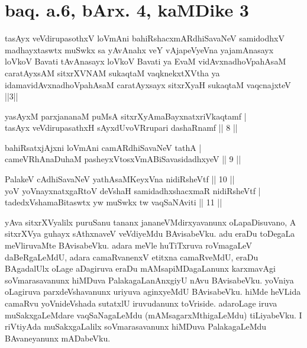 
\section*{baq. a.6, bArx. 4, kaMDike 3}

\begin{shl}
tasAyx veVdirupasothxV loVmAni bahiRshacxmARdhiSavaNeV samidodhxV madhayxtaswtx muSwkx sa yAvAnahx veY vAjapeVyeVna yajamAnasayx loVkoV Bavati tAvAnasayx loVkoV Bavati ya EvaM vidAvxnadhoVpahAsaM caratAyxsAM sitxrXVNAM sukaqtaM vaqknekxtXV\s tha ya idamavidAvxnadhoVpahAsaM caratAyxsayx sitxrXyaH sukaqtaM vaqcnajxteV ||3||
\end{shl}

\begin{shl}
yasAyxM  parxjananaM puMsA sitxrXyAmaBayxnatxriVkaqtamf | \\
tasAyx veVdirupasathxH sAyxdUvoVRrupari dashaRnamf \hfill|| 8 || 
\end{shl}

\begin{shl}
bahiRsatxjAjxni loVmAni camARdhiSavaNeV tathA | \\
cameVRhA\s \s naDuhaM pasheyxVtosxVmABiSavasidadhxyeV \hfill|| 9 || 
\end{shl}

\begin{shl}
PalakeV cAdhiSavaNeV yathAsaMKeyxVna nidiRsheVtf \hfill|| 10 || \\
yoV yoVnayxnatxgaRtoV deVshaH samidadhxshacxmaR nidiRsheVtf | \\
tadedxVshamaBitaswtx yw muSwkx tw vaqSaNAviti \hfill|| 11 || 
\end{shl}

\begin{artha}
yAva sitxrXVyalilx puruSanu tananx jananeVMdirxyavanunx oLapaDisuvano, 
A sitxrXVya guhayx sAthxnaveV veVdiyeMdu BAvisabeVku. adu eraDu toDegaLa 
meVliruvaMte BAvisabeVku. adara meVle huTiTxruva roVmagaLeV 
daBeRgaLeMdU, adara camaRvanenxV etitxna camaRveMdU, eraDu BAgadalUlx 
oLage aDagiruva eraDu mAMsapiMDagaLanunx karxmavAgi soVmarasavanunx 
hiMDuva PalakagaLanAnxgiyU nAvu BAvisabeVku. yoVniya oLagiruva 
parxdeVshavanunx uriyuva aginxyeMdU BAvisabeVku. hiMde heVLida camaRvu 
yoVnideVshada sutatxlU iruvudanunx toVriside. adaroLage iruva 
muSakxgaLeMdare vaqSaNagaLeMdu (mAMsagarxMthigaLeMdu) tiLiyabeVku. I 
riVtiyAda muSakxgaLalilx soVmarasavanunx hiMDuva PalakagaLeMdu 
BAvaneyanunx mADabeVku.
\end{artha}

